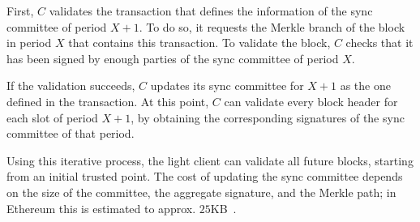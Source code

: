 First, $C$ validates the transaction that defines the information of the sync
committee of period $X+1$. To do so, it requests the Merkle branch of the block
in period $X$ that contains this transaction. To validate the block, $C$ checks
that it has been signed by enough parties of the sync committee of period $X$.

If the validation succeeds, $C$ updates its sync committee for $X+1$ as the one
defined in the transaction. At this point, $C$ can validate every block header
for each slot of period $X+1$, by obtaining the corresponding signatures of the
sync committee of that period.

Using this iterative process, the light client can validate all future blocks,
starting from an initial trusted point. The cost of updating the sync committee
depends on the size of the committee, the aggregate signature, and the Merkle
path; in Ethereum this is estimated to approx. $25$KB~\cite{sync-committee}.
